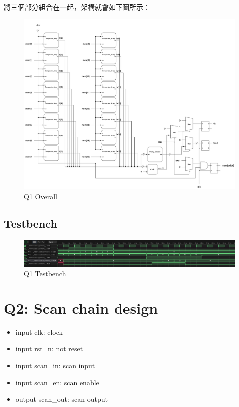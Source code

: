 \documentclass[10.5pt,compsoc,UTF8]{CjC}
\theoremstyle{mystyle}
\begin{document}
將三個部分組合在一起，架構就會如下圖所示：
\begin{figure}[h!]
  \centering
  \includegraphics[width=\textwidth]{./img/Q1.png}
  \caption{Q1 Overall}
  \label{fig:Q1-Overall}
\end{figure}
\newpage

\subsection{Testbench}
\begin{figure}[h!]
  \centering
  \includegraphics[width=\textwidth]{./img/Q1-tb.png}
  \caption{Q1 Testbench}
  \label{fig:Q1-tb}
\end{figure}

\section{Q2: Scan chain design}
\begin{itemize}
  \item input clk: clock
  \item input rst\_n: not reset
  \item input scan\_in: scan input
  \item input scan\_en: scan enable
  \item output scan\_out: scan output
\end{itemize}
\end{document}
